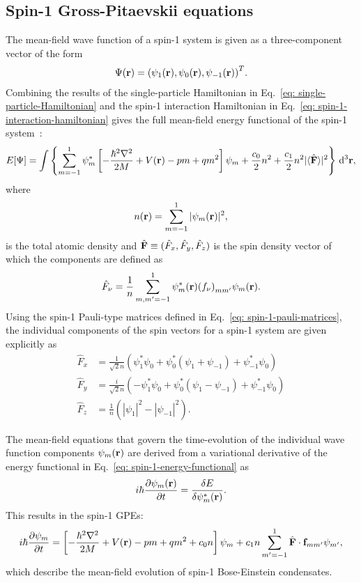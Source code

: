 \subsection{Spin-1 Gross-Pitaevskii equations}\label{subsec: spin-1-gpes}
The mean-field wave function of a spin-1 system is given as a three-component
vector of the form
\begin{align}
    \Psi(\vb{r}) = {(\psi_1(\vb{r}), \psi_0(\vb{r}), \psi_{-1}(\vb{r}))}^T.
\end{align}
Combining the results of the single-particle Hamiltonian in
Eq.~\eqref{eq: single-particle-Hamiltonian} and the spin-1 interaction
Hamiltonian in Eq.~\eqref{eq: spin-1-interaction-hamiltonian} gives the
full mean-field energy functional of the spin-1 system~\cite{Kawaguchi2012}:
\begin{align}\label{eq: spin-1-energy-functional}
    E[\Psi] = \int \left\{\sum_{m=-1}^1\psi_m^*\left[-\frac{\hbar^2\nabla^2}{2M}
    + V(\vb{r}) - pm + qm^2\right]\psi_m
    + \frac{c_0}{2}n^2 + \frac{c_1}{2}n^2|\langle \hat{\vb{F}} \rangle |^2 \right\} \, \dd^3\vb{r},
\end{align}
where
\begin{align}
    n(\vb{r}) = \sum_{m=-1}^1|\psi_m(\vb{r})|^2,
\end{align}
is the total atomic density and \(\hat{\vb{F}}\equiv(\hat{F}_x, \hat{F}_y,
\hat{F}_z)\) is the spin density vector of which the components are defined as
\begin{align}\label{eq: spin-vector-components}
    \hat{F}_\nu = \frac{1}{n} \sum_{m,m'=-1}^1 \psi^*_m(\vb{r}){(f_\nu)}_{mm'}
        \psi_m(\vb{r}).
\end{align}
Using the spin-1 Pauli-type matrices defined in
Eq.~\eqref{eq: spin-1-pauli-matrices}, the individual components of the spin
vectors for a spin-1 system are given explicitly as
\begin{align}\label{eq: spin-1-spin-vectors}
    \hat{F}_x &= \frac{1}{\sqrt{2}n} \left(\psi_1^*\psi_0
    + \psi_0^*(\psi_1+\psi_{-1}) + \psi_{-1}^*\psi_0\right) \\
    \hat{F}_y &= \frac{i}{\sqrt{2}n}\left(-\psi_1^*\psi_0
    + \psi_0^*(\psi_1-\psi_{-1}) +\psi_{-1}^*\psi_0\right) \\
    \hat{F}_z &= \frac{1}{n}\left(|\psi_1|^2-|\psi_{-1}|^2\right).
\end{align}

The mean-field equations that govern the time-evolution of the individual
wave function components \(\psi_m(\vb{r})\) are derived from a variational
derivative of the energy functional in Eq.~\eqref{eq: spin-1-energy-functional}
as
\begin{align}\label{eq: energy-variational}
    i\hbar\pdv{\psi_m(\vb{r})}{t} = \fdv{E}{\psi_m^*(\vb{r})}.
\end{align}
This results in the spin-1 GPEs:
\begin{equation}\label{eq: spin-1-GPEs}
    i\hbar \pdv{\psi_m}{t} = \left[-\frac{\hbar^2\nabla^2}{2M} + V(\vb{r})
        - pm + qm^2 + c_0n\right]\psi_m
    + c_1n\sum_{m'=-1}^{1}\hat{\vb{F}}\cdot \vb{f}_{mm'}\psi_{m'},
\end{equation}
which describe the mean-field evolution of spin-1 Bose-Einstein condensates.

